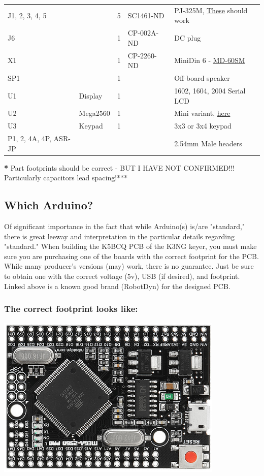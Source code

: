 \documentclass[11pt]{article}
\begin{document}
\begin{center}
\begin{tabular}{llrll}
J1, 2, 3, 4, 5 &  & 5 & SC1461-ND & PJ-325M, \href{https://www.digikey.com/product-detail/en/switchcraft-inc/35RAPC4BV4/SC1461-ND/528670}{These} should work\\
J6 &  & 1 & CP-002A-ND & DC plug\\
X1 &  & 1 & CP-2260-ND & MiniDin 6 - \href{https://www.digikey.com/product-detail/en/cui-inc/MD-60SM/CP-2260-ND/96940}{MD-60SM}\\
SP1 &  & 1 &  & Off-board speaker\\
U1 & Display & 1 &  & 1602, 1604, 2004 Serial LCD\\
U2 & Mega2560 & 1 &  & Mini variant, \href{https://robotdyn.com/mega-2560-pro-mini-atmega2560-16au.html}{here}\\
U3 & Keypad & 1 &  & 3x3 or 3x4 keypad\\
P1, 2, 4A, 4P, ASR-JP &  &  &  & 2.54mm Male headers\\
\end{tabular}
\end{center}
\textbf{*} Part footprints should be correct - BUT I HAVE NOT CONFIRMED!!! Particularly capacitors lead spacing!***


\subsection{Which Arduino?}
\label{sec:org5246890}

Of significant importance in the fact that while Arduino(s) is/are "standard," there is great leeway and interpretation in the particular details regarding "standard."  When building the K5BCQ PCB of the K3NG keyer, you must make sure you are purchasing one of the boards with the correct footprint for the PCB.  While many producer's versions (may) work, there is no guarantee.  Just be sure to obtain one with the correct voltage (5v), USB (if desired), and footprint.  Linked above is a known good brand (RobotDyn) for the designed PCB.

\subsubsection{The \textbf{correct} footprint looks like:}
\label{sec:orge5aad90}
\begin{center}
\includegraphics[width=.9\linewidth]{../png/2.1/Correct2560.png}
\end{center}
\end{document}
